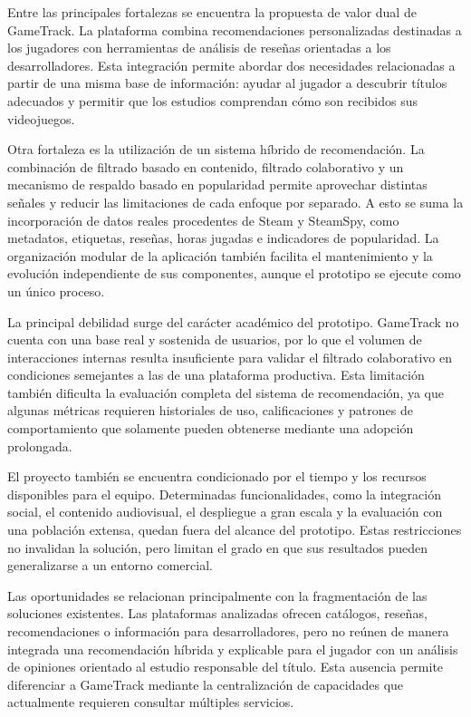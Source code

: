 Entre las principales fortalezas se encuentra la propuesta de valor dual de GameTrack. La plataforma combina recomendaciones personalizadas destinadas a los jugadores con herramientas de análisis de reseñas orientadas a los desarrolladores. Esta integración permite abordar dos necesidades relacionadas a partir de una misma base de información: ayudar al jugador a descubrir títulos adecuados y permitir que los estudios comprendan cómo son recibidos sus videojuegos.

Otra fortaleza es la utilización de un sistema híbrido de recomendación. La combinación de filtrado basado en contenido, filtrado colaborativo y un mecanismo de respaldo basado en popularidad permite aprovechar distintas señales y reducir las limitaciones de cada enfoque por separado. A esto se suma la incorporación de datos reales procedentes de Steam y SteamSpy, como metadatos, etiquetas, reseñas, horas jugadas e indicadores de popularidad. La organización modular de la aplicación también facilita el mantenimiento y la evolución independiente de sus componentes, aunque el prototipo se ejecute como un único proceso.

La principal debilidad surge del carácter académico del prototipo. GameTrack no cuenta con una base real y sostenida de usuarios, por lo que el volumen de interacciones internas resulta insuficiente para validar el filtrado colaborativo en condiciones semejantes a las de una plataforma productiva. Esta limitación también dificulta la evaluación completa del sistema de recomendación, ya que algunas métricas requieren historiales de uso, calificaciones y patrones de comportamiento que solamente pueden obtenerse mediante una adopción prolongada.

El proyecto también se encuentra condicionado por el tiempo y los recursos disponibles para el equipo. Determinadas funcionalidades, como la integración social, el contenido audiovisual, el despliegue a gran escala y la evaluación con una población extensa, quedan fuera del alcance del prototipo. Estas restricciones no invalidan la solución, pero limitan el grado en que sus resultados pueden generalizarse a un entorno comercial.

Las oportunidades se relacionan principalmente con la fragmentación de las soluciones existentes. Las plataformas analizadas ofrecen catálogos, reseñas, recomendaciones o información para desarrolladores, pero no reúnen de manera integrada una recomendación híbrida y explicable para el jugador con un análisis de opiniones orientado al estudio responsable del título. Esta ausencia permite diferenciar a GameTrack mediante la centralización de capacidades que actualmente requieren consultar múltiples servicios.

